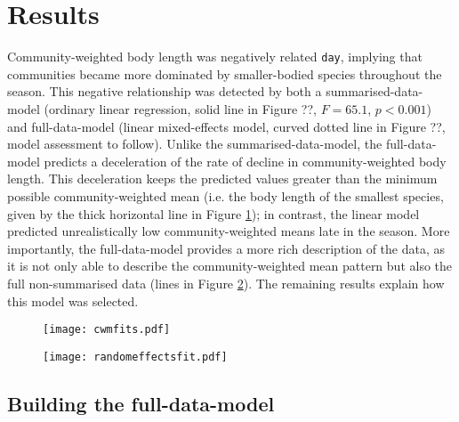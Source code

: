 \documentclass[12pt]{ecology}
\begin{document}



\section{Results}

Community-weighted body length was negatively related \texttt{day}, implying that communities became more dominated by smaller-bodied species throughout the season.  This negative relationship was detected by both a summarised-data-model (ordinary linear regression, solid line in Figure ??, $F = 65.1$, $p < 0.001$) and full-data-model (linear mixed-effects model, curved dotted line in Figure ??, model assessment to follow).  Unlike the summarised-data-model, the full-data-model predicts a deceleration of the rate of decline in community-weighted body length.  This deceleration keeps the predicted values greater than the minimum possible community-weighted mean (i.e. the body length of the smallest species, given by the thick horizontal line in Figure \ref{fig:cwmfits}); in contrast, the linear model predicted unrealistically low community-weighted means late in the season.  More importantly, the full-data-model provides a more rich description of the data, as it is not only able to describe the community-weighted mean pattern but also the full non-summarised data (lines in Figure \ref{fig:randomeffectsfit}).  The remaining results explain how this model was selected.

\begin{figure}
\texttt{[image: cwmfits.pdf]}
\caption{}
\label{fig:cwmfits}
\end{figure}

\begin{figure}
\texttt{[image: randomeffectsfit.pdf]}
\caption{}
\label{fig:randomeffectsfit}
\end{figure}

\subsection{Building the full-data-model}
\end{document}
